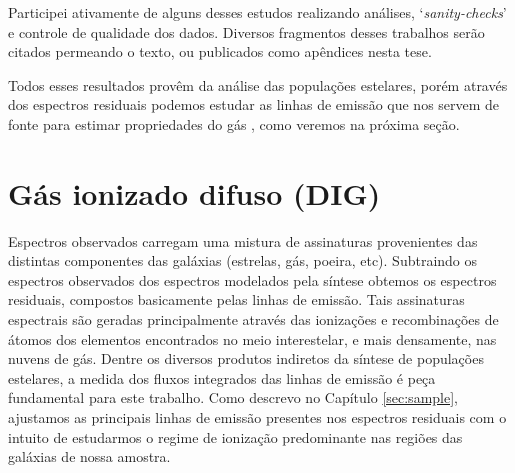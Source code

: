 Participei ativamente de alguns desses estudos realizando análises, `{\em sanity-checks}' e controle de qualidade dos dados. Diversos fragmentos desses trabalhos serão citados permeando o texto, ou publicados como apêndices nesta tese.

Todos esses resultados provêm da análise das populações estelares, porém através dos espectros residuais
podemos estudar as linhas de emissão que nos servem de fonte para estimar propriedades do gás \citep{Asari.etal.2007a}, como veremos na próxima seção.


\section{Gás ionizado difuso (DIG)}
\label{sec:intro:DIG}

Espectros observados carregam uma mistura de assinaturas provenientes das distintas componentes das galáxias (estrelas, gás, poeira, etc). Subtraindo os espectros observados dos espectros modelados pela síntese obtemos os espectros residuais, compostos basicamente pelas linhas de emissão. Tais assinaturas espectrais são geradas principalmente através das ionizações e recombinações de átomos dos elementos encontrados no meio interestelar, e mais densamente, nas nuvens de gás. Dentre os diversos produtos indiretos da síntese de populações estelares, a medida dos fluxos integrados das linhas de emissão é peça fundamental para este trabalho.
Como descrevo no Capítulo \ref{sec:sample}, ajustamos as principais linhas de emissão presentes nos espectros residuais com o intuito de estudarmos o regime de ionização predominante nas regiões das galáxias de nossa amostra.

